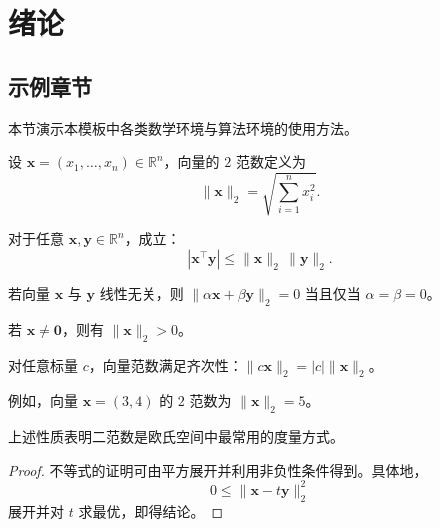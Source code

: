 \chapter{绪论} %

\section{示例章节}

本节演示本模板中各类数学环境与算法环境的使用方法。

\begin{definition}[向量范数] %
设 $\mathbf{x}=(x_1,\dots,x_n)\in\mathbb{R}^n$，向量的 $2$ 范数定义为
\[
\|\mathbf{x}\|_2=\sqrt{\sum_{i=1}^n x_i^2}.
\]
\end{definition}

\begin{theorem} %
对于任意 $\mathbf{x},\mathbf{y}\in\mathbb{R}^n$，成立：
\[
|\mathbf{x}^\top \mathbf{y}| \le \|\mathbf{x}\|_2 \, \|\mathbf{y}\|_2.
\]
\end{theorem}

\begin{lemma} %
若向量 $\mathbf{x}$ 与 $\mathbf{y}$ 线性无关，则 $\|\alpha \mathbf{x} + \beta \mathbf{y}\|_2 = 0$ 当且仅当 $\alpha=\beta=0$。
\end{lemma}

\begin{corollary} %
若 $\mathbf{x}\neq \mathbf{0}$，则有 $\|\mathbf{x}\|_2 > 0$。
\end{corollary}

\begin{proposition} %
对任意标量 $c$，向量范数满足齐次性：$\|c\mathbf{x}\|_2=|c|\|\mathbf{x}\|_2$。
\end{proposition}

\begin{example} %
例如，向量 $\mathbf{x}=(3,4)$ 的 $2$ 范数为 $\|\mathbf{x}\|_2=5$。
\end{example}

\begin{remark} %
上述性质表明二范数是欧氏空间中最常用的度量方式。
\end{remark}

\begin{proof} %
不等式的证明可由平方展开并利用非负性条件得到。具体地，
\[
0 \le \|\mathbf{x}-t\mathbf{y}\|_2^2
\]
展开并对 $t$ 求最优，即得结论。
\end{proof}

